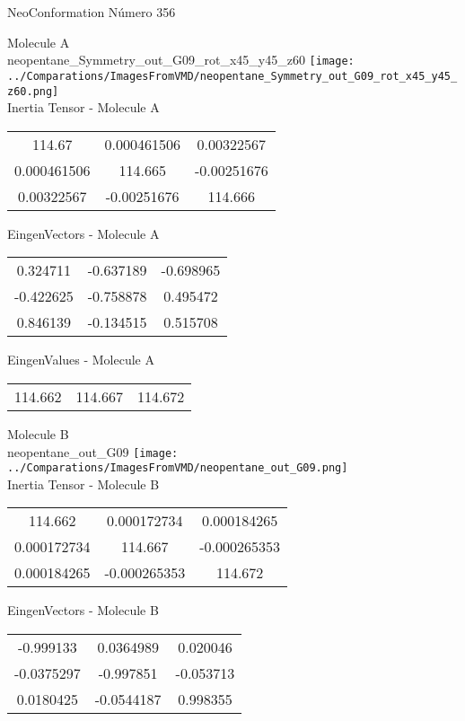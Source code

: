 \vtab[-2cm]
\begin{center}
{\large NeoConformation \tab Número 356}
\end{center}
\begin{multicols}{2}
\begin{center}

Molecule A \\ 
neopentane\_Symmetry\_out\_G09\_rot\_x45\_y45\_z60
\texttt{[image: ../Comparations/ImagesFromVMD/neopentane\_Symmetry\_out\_G09\_rot\_x45\_y45\_z60.png]}
\\
Inertia Tensor - Molecule A \\
\vtab

\begin{tabular}{|c c c|}
114.67	 & 	0.000461506	 & 	0.00322567	 \\
0.000461506	 & 	114.665	 & 	-0.00251676	 \\
0.00322567	 & 	-0.00251676	 & 	114.666
\end{tabular}

\vtab
 EingenVectors - Molecule A     \\
\vtab
\begin{tabular}{|c c c|}
0.324711	 & 	-0.637189	 & 	-0.698965	 \\
-0.422625	 & 	-0.758878	 & 	0.495472	 \\
0.846139	 & 	-0.134515	 & 	0.515708
\end{tabular}

\vtab
 EingenValues - Molecule A     \\
\vtab
\begin{tabular}{|c c c|}
114.662	 & 	114.667	 & 	114.672	 \\
\end{tabular}
\columnbreak

Molecule B \\ 
neopentane\_out\_G09
\texttt{[image: ../Comparations/ImagesFromVMD/neopentane\_out\_G09.png]}
\\
Inertia Tensor - Molecule B \\
\vtab

\begin{tabular}{|c c c|}
114.662	 & 	0.000172734	 & 	0.000184265	 \\
0.000172734	 & 	114.667	 & 	-0.000265353	 \\
0.000184265	 & 	-0.000265353	 & 	114.672
\end{tabular}

\vtab
 EingenVectors - Molecule B     \\
\vtab
\begin{tabular}{|c c c|}
-0.999133	 & 	0.0364989	 & 	0.020046	 \\
-0.0375297	 & 	-0.997851	 & 	-0.053713	 \\
0.0180425	 & 	-0.0544187	 & 	0.998355
\end{tabular}


\end{center}
\end{multicols}
